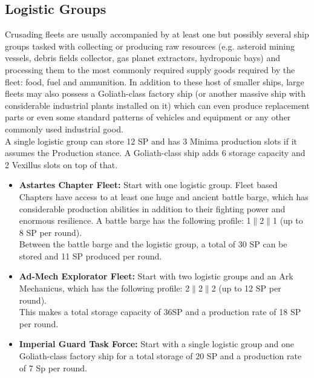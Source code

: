 \subsection{Logistic Groups}
Crusading fleets are usually accompanied by at least one but possibly several ship groups tasked with collecting or producing raw resources (e.g. asteroid mining vessels, debris fields collector, gas planet extractors, hydroponic bays) and processing them to the most commonly required supply goods required by the fleet: food, fuel and ammunition.
In addition to these host of smaller ships, large fleets may also possess a Goliath-class factory ship (or another massive ship with considerable industrial plants installed on it) which can even produce replacement parts or even some standard patterns of vehicles and equipment or any other commonly used industrial good.\\
A single logistic group can store 12 SP and has 3 Minima production slots if it assumes the Production stance. A Goliath-class ship adds 6 storage capacity and 2 Vexillus slots on top of that.
\begin{itemize}
	\item \textbf{Astartes Chapter Fleet:} Start with one logistic group. Fleet based Chapters have access to at least one huge and ancient battle barge, which has considerable production abilities in addition to their fighting power and enormous resilience. A battle barge has the following profile: 1$\|$2$\|$1 (up to 8 SP per round). \\
	Between the battle barge and the logistic group, a total of 30 SP can be stored and 11 SP produced per round.
	
	\item \textbf{Ad-Mech Explorator Fleet:} Start with two logistic groups and an Ark Mechanicus, which has the following profile: 2$\|$2$\|$2 (up to 12 SP per round).\\
	This makes a total storage capacity of 36SP and a production rate of 18 SP per round.

	\item \textbf{Imperial Guard Task Force:} Start with a single logistic group and one Goliath-class factory ship for a total storage of 20 SP and a production rate of 7 Sp per round.
\end{itemize}

